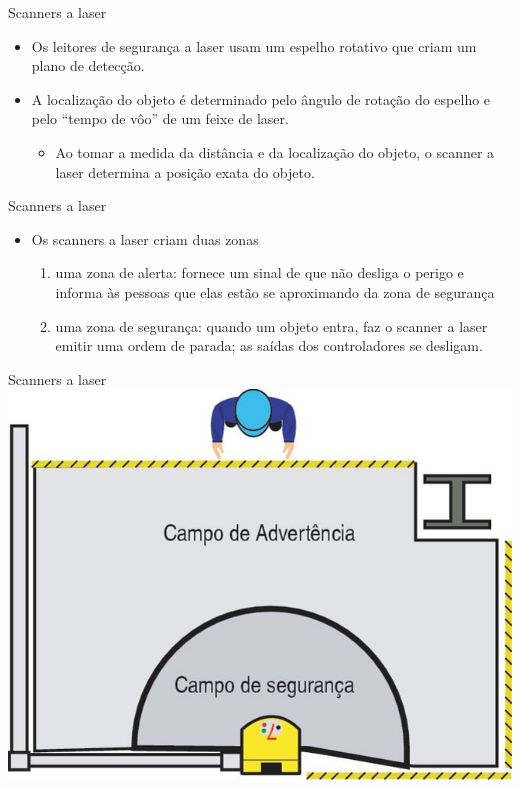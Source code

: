 \documentclass[aspectratio=169,
				xcolor=table]{beamer}
\begin{document}
		\begin{frame}{Scanners a laser}
			\begin{itemize}
				\item Os leitores de segurança a laser usam um espelho rotativo que criam um plano de detecção. 
				\vspace{0.8cm}
				\item A localização do objeto é determinado pelo ângulo de rotação do espelho e pelo “tempo de vôo” de um feixe de laser.
				\begin{itemize}
					\item Ao tomar a medida da distância e da localização do objeto, o scanner a laser determina a posição exata do objeto. 
				\end{itemize}
			\end{itemize}
		\end{frame}
		
		\begin{frame}{Scanners a laser}
			\begin{itemize}
				\item Os scanners a laser criam duas zonas
				\begin{enumerate}
					\item uma zona de alerta: fornece um sinal de que não desliga o perigo e informa às pessoas que elas estão se aproximando da zona de segurança 
					\item uma zona de segurança: quando um objeto entra, faz o scanner a laser emitir uma ordem de parada; as saídas dos controladores se desligam.
				\end{enumerate}
			\end{itemize}
		\end{frame}
		
		\begin{frame}{Scanners a laser}
			\centering
			\includegraphics[scale=.5]{../figs/cap03/Imagem31}
		\end{frame}
		
\end{document}
